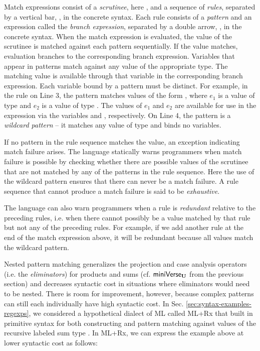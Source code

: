 Match expressions consist of a \emph{scrutinee}, here , and a sequence of \emph{rules}, separated by a vertical bar, \li{|}, in the concrete syntax. Each rule consists of a \emph{pattern} and an {expression} called the \emph{branch expression}, separated by a double arrow, \li{=>}, in the concrete syntax. When the {match} expression is evaluated, the value of the scrutinee is matched against each pattern sequentially. If the value matches, evaluation branches to the corresponding branch expression. Variables that appear in patterns match against any value of the appropriate type. The matching value is available through that variable in the corresponding branch expression. Each variable bound by a pattern must be distinct.  
For example, in the rule on Line 3, the pattern  matches values of the form , where $e_1$ is a value of type  and $e_2$ is a value of type . The values of $e_1$ and $e_2$ are available for use in the expression  via the variables  and , respectively. On Line 4, the pattern \li{_} is a \emph{wildcard pattern} -- it matches any value of type  and binds no variables.

If no pattern in the rule sequence matches the value, an exception indicating match failure arises. The language statically warns programmers when match failure is possible by checking whether there are possible values of the  scrutinee that are not matched by any of the patterns in the rule sequence. Here the use of the wildcard pattern ensures that there can never be a match failure. A rule sequence that cannot produce a match failure is said to be \emph{exhaustive}. 

The language can also warn programmers when a rule is \emph{redundant} relative to the preceding rules, i.e. when there cannot possibly be a value matched by that rule but not any of the preceding rules. For example, if we add  another rule at the end of the match expression above, it will be redundant because all values match the wildcard pattern. 

Nested pattern matching generalizes the projection and case analysis operators (i.e. the \emph{eliminators}) for products and sums (cf. $\mathsf{miniVerse}_\textbf{U}$ from the previous section) and decreases syntactic cost in situations where eliminators would need to be nested. There is room for improvement, however, because complex patterns can still each individually have high syntactic cost. In Sec. \ref{sec:syntax-examples-regexps}, we considered a hypothetical dialect of ML called ML+Rx that built in primitive syntax for both constructing and pattern matching against values of the recursive labeled sum type . In ML+Rx, we can express the example above at lower syntactic cost as follows:

